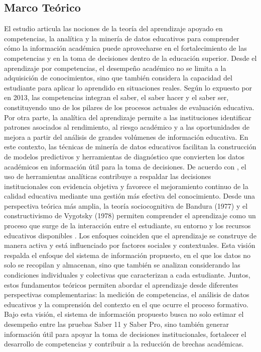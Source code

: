 \subsection{Marco Teórico}

El estudio articula las nociones de la teoría del aprendizaje apoyado en competencias, la analítica y la minería de datos educativos para comprender cómo la información académica puede aprovecharse en el fortalecimiento de las competencias y en la toma de decisiones dentro de la educación superior. Desde el aprendizaje por competencias, el desempeño académico no se limita a la adquisición de conocimientos, sino que también considera la capacidad del estudiante para aplicar lo aprendido en situaciones reales. Según lo expuesto por \cite{tobon2013formacion} en 2013, las competencias integran el saber, el saber hacer y el saber ser, constituyendo uno de los pilares de los procesos actuales de evaluación educativa. Por otra parte, la analítica del aprendizaje permite a las instituciones identificar patrones asociados al rendimiento, al riesgo académico y a las oportunidades de mejora a partir del análisis de grandes volúmenes de información educativa. En este contexto, las técnicas de minería de datos educativos facilitan la construcción de modelos predictivos y herramientas de diagnóstico que convierten los datos académicos en información útil para la toma de decisiones. De acuerdo con \cite{cobo2011aprendizaje}, el uso de herramientas analíticas contribuye a respaldar las decisiones institucionales con evidencia objetiva y favorece el mejoramiento continuo de la calidad educativa mediante una gestión más efectiva del conocimiento. 
Desde una perspectiva teórica más amplia, la teoría sociocognitiva de Bandura (1977) y el constructivismo de Vygotsky (1978) permiten comprender el aprendizaje como un proceso que surge de la interacción entre el estudiante, su entorno y los recursos educativos disponibles \cite{bandura1977self} \cite{vygotsky1978mind}. Los enfoques coinciden que el aprendizaje se construye de manera activa y está influenciado por factores sociales y contextuales. Esta visión respalda el enfoque del sistema de información propuesto, en el que los datos no solo se recopilan y almacenan, sino que también se analizan considerando las condiciones individuales y colectivas que caracterizan a cada estudiante.  Juntos, estos fundamentos teóricos permiten abordar el aprendizaje desde diferentes perspectivas complementarias: la medición de competencias, el análisis de datos educativos y la comprensión del contexto en el que ocurre el proceso formativo. Bajo esta visión, el sistema de información propuesto busca no solo estimar el desempeño entre las pruebas Saber 11 y Saber Pro, sino también generar información útil para apoyar la toma de decisiones institucionales, fortalecer el desarrollo de competencias y contribuir a la reducción de brechas académicas.


